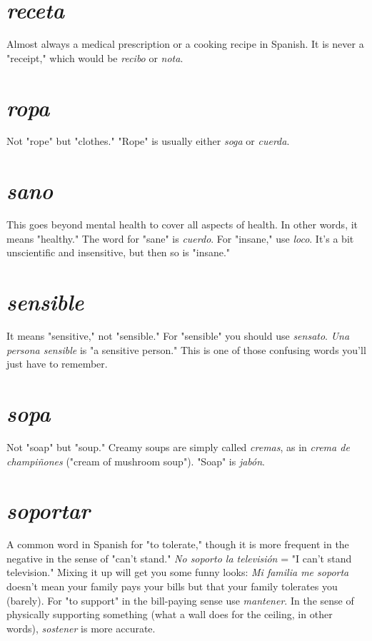 \documentclass[14pt,a4paper,oneside]{memoir}
\begin{document}
\section{\emph{receta}}

Almost always a medical prescription or a cooking
recipe in Spanish. It is never a "receipt," which would be \emph{recibo} or
\emph{nota}.

\section{\emph{ropa}}

Not "rope" but "clothes." "Rope" is usually either
\emph{soga} or \emph{cuerda}.

\section{\emph{sano}}

This goes beyond mental health to cover all aspects of
health. In other words, it means "healthy." The word for "sane" is
\emph{cuerdo}. For "insane," use \emph{loco}. It's a bit unscientific and insensitive, but then so is "insane."

\section{\emph{sensible}}

It means "sensitive," not "sensible." For "sensible" you should use \emph{sensato}. \emph{Una persona sensible} is "a sensitive
person." This is one of those confusing words you'll just have to
remember.

\section{\emph{sopa}}

Not "soap" but "soup." Creamy soups are simply
called \emph{cremas}, as in \emph{crema de champiñones} ("cream of mushroom
soup"). "Soap" is \emph{jabón}.

\section{\emph{soportar}}

A common word in Spanish for "to tolerate,"
though it is more frequent in the negative in the sense of "can't stand."
\emph{No soporto la televisión} = "I can't stand television." Mixing it up will
get you some funny looks: \emph{Mi familia me soporta} doesn't mean your
family pays your bills but that your family tolerates you (barely). For
"to support" in the bill-paying sense use \emph{mantener}. In the sense of
physically supporting something (what a wall does for the ceiling, in
other words), \emph{sostener} is more accurate.
\end{document}
